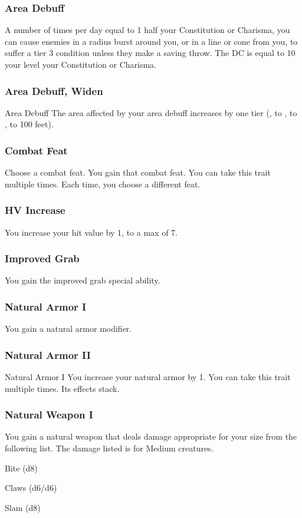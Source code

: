 \subsubsection{Area Debuff}
\featben A number of times per day equal to 1 \add half your Constitution or Charisma, you can cause enemies in a \areasmall radius burst around you, or in a \areamed line or cone from you, to suffer a tier 3 condition unless they make a saving throw. The DC is equal to 10 \add your level \add your Constitution or Charisma.

\subsubsection{Area Debuff, Widen}
\featpre Area Debuff
\featben The area affected by your area debuff increases by one tier (\areasmall, to \areamed, to \arealarge, to 100 feet).

\subsubsection{Combat Feat}
Choose a combat feat.
\featben You gain that combat feat.
 You can take this trait multiple times. Each time, you choose a different feat.

\subsubsection{HV Increase}
\featben You increase your hit value by 1, to a max of 7.
\subsubsection{Improved Grab}
\featben You gain the improved grab special ability. 

\subsubsection{Natural Armor I}
\featben You gain a  natural armor modifier.

\subsubsection{Natural Armor II}
\featpre Natural Armor I
\featben You increase your natural armor by 1.
 You can take this trait multiple times. Its effects stack.

\subsubsection{Natural Weapon I}
\featben You gain a natural weapon that deals damage appropriate for your size from the following list. The damage listed is for Medium creatures.
\begin{itemize*}
    \item Bite (d8)
    \item Claws (d6/d6)
    \item Slam (d8)
\end{itemize*}

